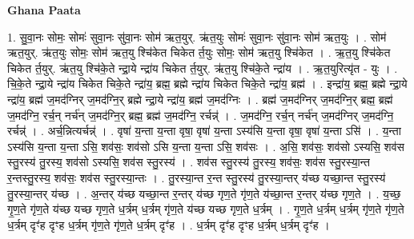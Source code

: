 \documentclass[17pt]{extarticle}
\begin{document}
\textbf{Ghana Paata } \newline

1. सु॒वा॒नः सोमः॒ सोमः॑ सुवा॒नः सु॑वा॒नः सोम॑ ऋत॒युर्. ऋ॑त॒युः सोमः॑ सुवा॒नः सु॑वा॒नः सोम॑ ऋत॒युः । . सोम॑ ऋत॒युर्. ऋ॑त॒युः सोमः॒ सोम॑ ऋत॒यु श्चि॑केत चिकेत र्त॒युः सोमः॒ सोम॑ ऋत॒यु श्चि॑केत । . ऋ॒त॒यु श्चि॑केत चिकेत र्त॒युर्. ऋ॑त॒यु श्चि॑के॒ते न्द्रा॒ये न्द्रा॑य चिकेत र्त॒युर्. ऋ॑त॒यु श्चि॑के॒ते न्द्रा॑य । . ऋ॒त॒युरित्यृ॑त - युः । . चि॒के॒ते न्द्रा॒ये न्द्रा॑य चिकेत चिके॒ते न्द्रा॑य॒ ब्रह्म॒ ब्रह्मे न्द्रा॑य चिकेत चिके॒ते न्द्रा॑य॒ ब्रह्म॑ । . इन्द्रा॑य॒ ब्रह्म॒ ब्रह्मे न्द्रा॒ये न्द्रा॑य॒ ब्रह्म॑ ज॒मद॑ग्निर् ज॒मद॑ग्नि॒र् ब्रह्मे न्द्रा॒ये न्द्रा॑य॒ ब्रह्म॑ ज॒मद॑ग्निः । . ब्रह्म॑ ज॒मद॑ग्निर् ज॒मद॑ग्नि॒र् ब्रह्म॒ ब्रह्म॑ ज॒मद॑ग्नि॒ रर्च॒न् नर्च॑न् ज॒मद॑ग्नि॒र् ब्रह्म॒ ब्रह्म॑ ज॒मद॑ग्नि॒ रर्चन्न्॑ । . ज॒मद॑ग्नि॒ रर्च॒न् नर्च॑न् ज॒मद॑ग्निर् ज॒मद॑ग्नि॒ रर्चन्न्॑ । . अर्च॒न्नित्यर्चन्न्॑ । . वृषा॑ य॒न्ता य॒न्ता वृषा॒ वृषा॑ य॒न्ता ऽस्य॑सि य॒न्ता वृषा॒ वृषा॑ य॒न्ता ऽसि॑ । . य॒न्ता ऽस्य॑सि य॒न्ता य॒न्ता ऽसि॒ शव॑सः॒ शव॑सो ऽसि य॒न्ता य॒न्ता ऽसि॒ शव॑सः । . अ॒सि॒ शव॑सः॒ शव॑सो ऽस्यसि॒ शव॑स स्तु॒रस्य॑ तु॒रस्य॒ शव॑सो ऽस्यसि॒ शव॑स स्तु॒रस्य॑ । . शव॑स स्तु॒रस्य॑ तु॒रस्य॒ शव॑सः॒ शव॑स स्तु॒रस्या॒न्त र॒न्तस्तु॒रस्य॒ शव॑सः॒ शव॑स स्तु॒रस्या॒न्तः । . तु॒रस्या॒न्त र॒न्त स्तु॒रस्य॑ तु॒रस्या॒न्तर् य॑च्छ यच्छा॒न्त स्तु॒रस्य॑ तु॒रस्या॒न्तर् य॑च्छ । . अ॒न्तर् य॑च्छ यच्छा॒न्त र॒न्तर् य॑च्छ गृण॒ते गृ॑ण॒ते य॑च्छा॒न्त र॒न्तर् य॑च्छ गृण॒ते । . य॒च्छ॒ गृ॒ण॒ते गृ॑ण॒ते य॑च्छ यच्छ गृण॒ते ध॒र्त्रम् ध॒र्त्रम् गृ॑ण॒ते य॑च्छ यच्छ गृण॒ते ध॒र्त्रम् । . गृ॒ण॒ते ध॒र्त्रम् ध॒र्त्रम् गृ॑ण॒ते गृ॑ण॒ते ध॒र्त्रम् दृꣳ॑ह दृꣳह ध॒र्त्रम् गृ॑ण॒ते गृ॑ण॒ते ध॒र्त्रम् दृꣳ॑ह । . ध॒र्त्रम् दृꣳ॑ह दृꣳह ध॒र्त्रम् ध॒र्त्रम् दृꣳ॑ह । \newline
\end{document}
